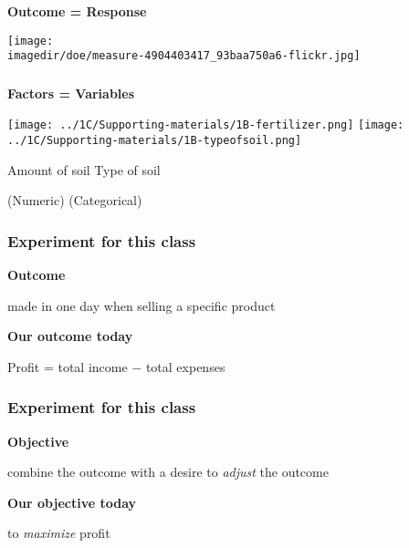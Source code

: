 
\begin{frame}\frametitle{}
	\LARGE \textbf{{\color{purple} Outcome = Response}}
	
	
	
	\begin{flushright}
		\texttt{[image: \\imagedir/doe/measure-4904403417\_93baa750a6-flickr.jpg]}
		
	\end{flushright}
\end{frame}

\begin{frame}\frametitle{}
	\LARGE \textbf{{\color{purple} Factors = Variables}}
	
	
	
	\begin{flushright}
		\texttt{[image: ../1C/Supporting-materials/1B-fertilizer.png]}
		\texttt{[image: ../1C/Supporting-materials/1B-typeofsoil.png]}

		Amount of soil	\hfill Type of soil 
		
		(Numeric)	\hfill (Categorical)
	\end{flushright}
\end{frame}

\begin{frame}\frametitle{Experiment for this class}
	
	{\LARGE\textbf{{\color{purple} Outcome}}}
	
		 made in one day when selling a specific product
		
	\vspace{24pt}
	\pause
	
	{\LARGE\textbf{{\color{purple} Our outcome today}}}
	
		\qquad 	Profit = total income $-$ total expenses


	
\end{frame}

\begin{frame}\frametitle{Experiment for this class}
	
	{\LARGE\textbf{{\color{purple} Objective}}}
	
	
		\qquad combine the {\color{purple} outcome} with a desire to \emph{adjust} the outcome
		
	\vspace{24pt}
	\pause
	
	{\LARGE\textbf{{\color{purple} Our objective today}}}
	
		\qquad 	to \emph{maximize} profit
\end{frame}


